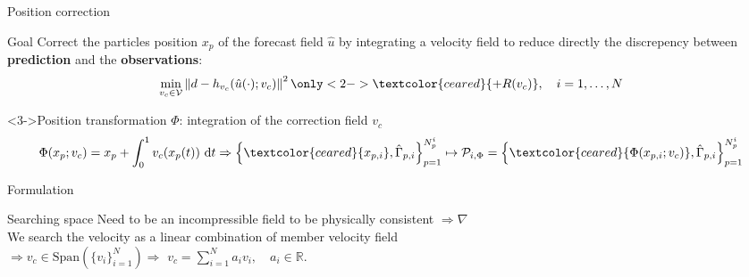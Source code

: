 \documentclass[aspectratio=169]{beamer} %
\begin{document}
\begin{frame}{Position correction}
    \begin{block}{Goal}
        Correct the particles position $x_p$ of the forecast field $\hat u$ by integrating a velocity field to reduce directly the discrepency between \textbf{prediction} and the \textbf{observations}:
        \begin{equation*}
            \min_{v_c \in \mathcal V} \left\|d - h_{v_c}(\hat u(\cdot); v_c) \right\|^2 \only<2->{\textcolor{ceared}{+ R(v_c)}}, \quad i = 1, \dots, N
        \end{equation*}
    \end{block}

    \begin{block}<3->{Position transformation $\Phi$: integration of the correction field $v_c$}
        \begin{equation*}
            \Phi(x_p; v_c) = x_p + \int_{0}^{1} v_c(x_p(t))~\mathrm{d}t \Rightarrow \left\{\textcolor{ceared}{x_{p,i}}, \hat \Gamma_{p,i}\right\}_{p=1}^{N^i_p} \mapsto \mathcal{P}_{i, \Phi} = \left\{\textcolor{ceared}{\Phi(x_{p,i}; v_c)}, \hat \Gamma_{p,i}\right\}_{p=1}^{N^i_p}
        \end{equation*}
    \end{block}
\end{frame}

\begin{frame}{Formulation}

    \begin{block}{Searching space}
        Need to be an incompressible field to be physically consistent $\Rightarrow \nabla $ \\
        We search the velocity as a linear combination of member velocity field  \\
        $\Rightarrow v_c \in \mathrm{Span}\left(\{v_i\}_{i=1}^{N}\right) \Rightarrow$ $v_c = \sum_{i=1}^N a_i v_i, \quad a_i \in \mathbb{R}$.
    \end{block}

    \vfill
\end{frame}
\end{document}
